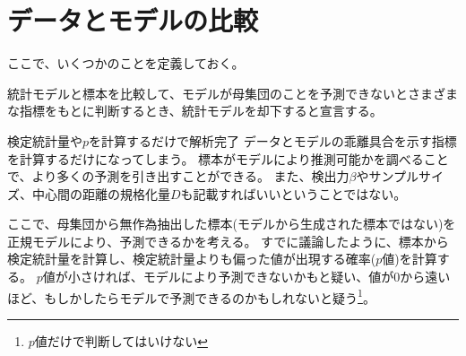 




\section{データとモデルの比較}
ここで、いくつかのことを定義しておく。
\begin{defi}
    統計モデルと標本を比較して、モデルが母集団のことを予測できないとさまざまな指標をもとに判断するとき、統計モデルを却下すると宣言する。
\end{defi}

\begin{SMbox}{検定統計量や$p$を計算するだけで解析完了}
 データとモデルの乖離具合を示す指標を計算するだけになってしまう。
 標本がモデルにより推測可能かを調べることで、より多くの予測を引き出すことができる。
 また、検出力$\beta$やサンプルサイズ、中心間の距離の規格化量$D$も記載すればいいということではない。
\end{SMbox}


ここで、母集団から無作為抽出した標本(モデルから生成された標本ではない)を正規モデルにより、予測できるかを考える。
すでに議論したように、標本から検定統計量を計算し、検定統計量よりも偏った値が出現する確率($p$値)を計算する。
$p$値が小さければ、モデルにより予測できないかもと疑い、値が$0$から遠いほど、もしかしたらモデルで予測できるのかもしれないと疑う\footnote{$p$値だけで判断してはいけない}。

